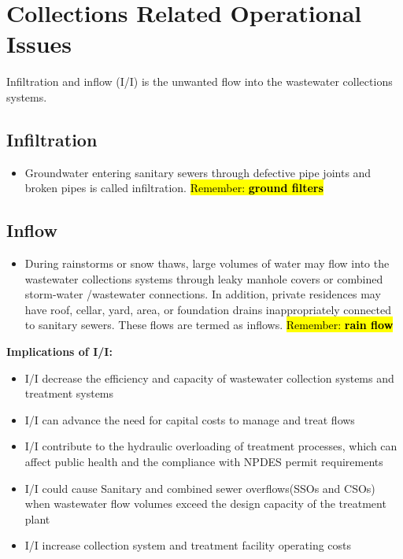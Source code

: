\section{Collections Related Operational Issues}
Infiltration and inflow (I/I) is the unwanted flow into the wastewater collections systems.
\subsection{Infiltration}
\begin{itemize} 
\item Groundwater entering sanitary sewers through defective pipe joints and broken pipes is called infiltration. \hl{Remember:  \textbf{ground filters}}
\end{itemize}

\subsection{Inflow}
\begin{itemize} 
\item During rainstorms or snow thaws, large volumes of water may flow into the wastewater collections systems through leaky manhole covers or combined storm-water /wastewater connections.  In addition, private residences may have roof, cellar, yard, area, or foundation drains inappropriately connected to sanitary sewers.  These flows are termed as inflows. \hl{Remember: \textbf{rain flow}}
\end{itemize}

\textbf{Implications of I/I:}\\%
\begin{itemize}
\item I/I decrease the efficiency and capacity of wastewater collection systems and treatment systems 
\item I/I can advance the need for capital costs to manage and treat flows
\item I/I contribute to the hydraulic overloading of treatment processes, which can affect public health and the compliance with NPDES permit requirements
\item I/I could cause Sanitary and combined sewer overflows(SSOs and CSOs) when wastewater flow volumes exceed the design capacity of the treatment plant 
\item I/I increase collection system and treatment facility operating costs
\end{itemize}

